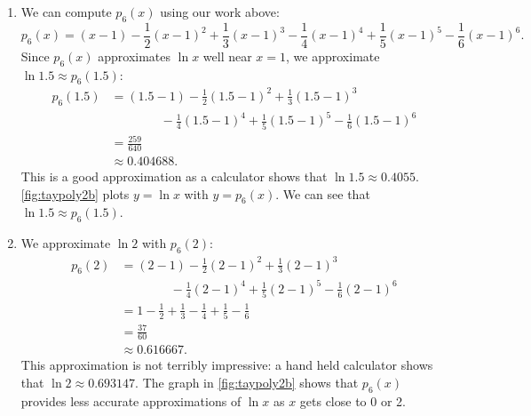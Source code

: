 \begin{example}
\begin{enumerate}
\item	We can compute $p_6(x)$ using our work above:
\[
p_6(x)
 = (x-1)-\frac12(x-1)^2+\frac13(x-1)^3-\frac14(x-1)^4+\frac15(x-1)^5-\frac16(x-1)^6.
\]
Since $p_6(x)$ approximates $\ln x$ well near $x=1$, we approximate $\ln 1.5 \approx p_6(1.5)$:
\begin{align*}
	p_6(1.5)
	&= (1.5-1)-\frac12(1.5-1)^2+\frac13(1.5-1)^3 \\
	&\qquad\qquad{}-\frac14(1.5-1)^4+\frac15(1.5-1)^5-\frac16(1.5-1)^6\\
	&=\frac{259}{640}\\
	&\approx 0.404688.
\end{align*}
%
%
This is a good approximation as a calculator shows that $\ln 1.5 \approx 0.4055.$  %
\autoref{fig:taypoly2b} plots $y=\ln x$ with $y=p_6(x)$. We can see that $\ln 1.5\approx p_6(1.5)$.

\item	
We approximate $\ln 2$ with $ p_6(2)$:
\begin{align*}
p_6(2) &= (2-1)-\frac12(2-1)^2+\frac13(2-1)^3 \\
			&\qquad\qquad{}-\frac14(2-1)^4+\frac15(2-1)^5-\frac16(2-1)^6\\
			&=	1-\frac12+\frac13-\frac14+\frac15-\frac16 \\
			&= \frac{37}{60}\\ 
			&\approx 0.616667.
\end{align*}
This approximation is not terribly impressive: a hand held calculator shows that $\ln 2 \approx 0.693147.$
The graph in \autoref{fig:taypoly2b} shows that $p_6(x)$ provides less accurate approximations of $\ln x$ as $x$ gets close to 0 or 2. 


\end{enumerate}
\end{example}
